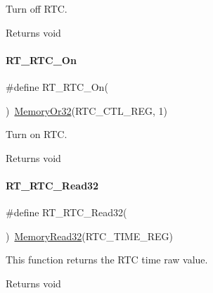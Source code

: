 Turn off R\+TC. 

\begin{DoxyReturn}{Returns}
void 
\end{DoxyReturn}
\mbox{\label{a00053_abcec88fd1699e238435a90f1b49f01fc}} 
\paragraph{\texorpdfstring{R\+T\+\_\+\+R\+T\+C\+\_\+\+On}{RT\_RTC\_On}}
{\footnotesize\ttfamily \#define R\+T\+\_\+\+R\+T\+C\+\_\+\+On(\begin{DoxyParamCaption}{ }\end{DoxyParamCaption})~\mbox{\hyperlink{a00020_a27874a97deab7cecdde5ddecf466e31e}{Memory\+Or32}}(R\+T\+C\+\_\+\+C\+T\+L\+\_\+\+R\+EG, 1)}



Turn on R\+TC. 

\begin{DoxyReturn}{Returns}
void 
\end{DoxyReturn}
\mbox{\label{a00053_a61ac395d30cde55137bf04acaec570f0}} 
\paragraph{\texorpdfstring{R\+T\+\_\+\+R\+T\+C\+\_\+\+Read32}{RT\_RTC\_Read32}}
{\footnotesize\ttfamily \#define R\+T\+\_\+\+R\+T\+C\+\_\+\+Read32(\begin{DoxyParamCaption}{ }\end{DoxyParamCaption})~\mbox{\hyperlink{a00020_a2d484dc15bdf30ee11ab3b05f31f0e16}{Memory\+Read32}}(R\+T\+C\+\_\+\+T\+I\+M\+E\+\_\+\+R\+EG)}



This function returns the R\+TC time raw value. 

\begin{DoxyReturn}{Returns}
void 
\end{DoxyReturn}
\mbox{\label{a00053_a8929da3f9ad422dd07f18d603c63b7b7}} 
